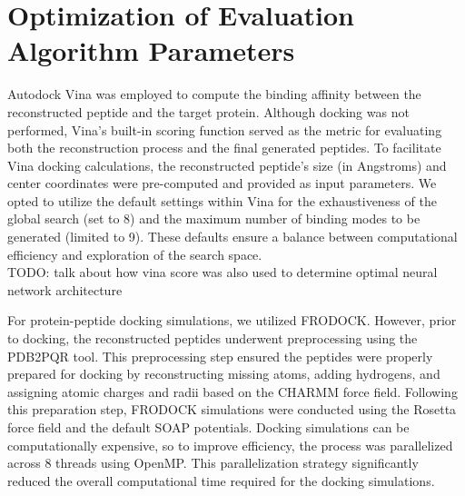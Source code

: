 \section{Optimization of Evaluation Algorithm Parameters}
Autodock Vina was employed to compute the binding affinity between the reconstructed peptide and the target protein. Although docking was not performed, Vina's built-in scoring function served as the metric for evaluating both the reconstruction process and the final generated peptides. To facilitate Vina docking calculations, the reconstructed peptide's size (in Angstroms) and center coordinates were pre-computed and provided as input parameters. We opted to utilize the default settings within Vina for the exhaustiveness of the global search (set to 8) and the maximum number of binding modes to be generated (limited to 9). These defaults ensure a balance between computational efficiency and exploration of the search space. \\
TODO: talk about how vina score was also used to determine optimal neural network architecture

For protein-peptide docking simulations, we utilized FRODOCK. However, prior to docking, the reconstructed peptides underwent preprocessing using the PDB2PQR tool. This preprocessing step ensured the peptides were properly prepared for docking by reconstructing missing atoms, adding hydrogens, and assigning atomic charges and radii based on the CHARMM force field. Following this preparation step, FRODOCK simulations were conducted using the Rosetta force field and the default SOAP potentials. Docking simulations can be computationally expensive, so to improve efficiency, the process was parallelized across 8 threads using OpenMP. This parallelization strategy significantly reduced the overall computational time required for the docking simulations.

